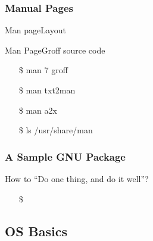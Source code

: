 \subsubsection{Manual Pages}
\label{sec:manual-pages}

\begin{frame}{Man page}{Layout}
  \begin{center}
  \end{center}
\end{frame}

\begin{frame}{Man Page}{Groff source code}
  \begin{minipage}[b]{.6\linewidth}
    \begin{center}
    \end{center}
  \end{minipage}
  \begin{minipage}[b]{.35\linewidth}\ttfamily
    \begin{itemize}
    \item[\$] man 7 groff
    \item[\$] man txt2man
    \item[\$] man a2x
    \item[\$] ls /usr/share/man
    \end{itemize}
  \end{minipage}
\end{frame}

\subsubsection{A Sample GNU Package}
\label{sec:sample-gnu-package}

\begin{frame}{How to ``Do one thing, and do it well''?}  
  \begin{itemize}
  \item[\$] 
  \end{itemize}
\end{frame}

\subsection{OS Basics}
\label{sec:os-basics}

